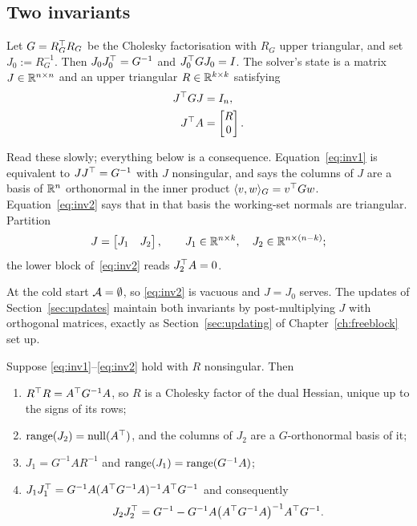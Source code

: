 \subsection{Two invariants}

Let $G = R_G^{\top} R_G$ be the Cholesky factorisation with $R_G$ upper triangular, and
set $J_0 := R_G^{-1}$. Then $J_0 J_0^{\top} = G^{-1}$ and $J_0^{\top} G J_0 = I$. The
solver's state is a matrix $J \in \mathbb{R}^{n\times n}$ and an upper triangular
$R \in \mathbb{R}^{k\times k}$ satisfying
\begin{align}
  J^{\top} G J &= I_n, \label{eq:inv1}\\
  J^{\top} A &= \begin{bmatrix} R \\ 0 \end{bmatrix}. \label{eq:inv2}
\end{align}

Read these slowly; everything below is a consequence. Equation~\eqref{eq:inv1} is
equivalent to $JJ^{\top} = G^{-1}$ with $J$ nonsingular, and says the columns of $J$ are
a basis of $\mathbb{R}^n$ orthonormal in the inner product
$\langle v, w \rangle_G = v^{\top} G w$. Equation~\eqref{eq:inv2} says that in that basis the
working-set normals are triangular. Partition
\begin{equation}
  J = \begin{bmatrix} J_1 & J_2 \end{bmatrix},
  \qquad J_1 \in \mathbb{R}^{n\times k},\quad J_2 \in \mathbb{R}^{n\times(n-k)};
  \label{eq:split}
\end{equation}
the lower block of~\eqref{eq:inv2} reads $J_2^{\top} A = 0$.

At the cold start $\mathcal{A} = \emptyset$, so \eqref{eq:inv2} is vacuous and
$J = J_0$ serves. The updates of Section~\ref{sec:updates} maintain both invariants
by post-multiplying $J$ with orthogonal matrices, exactly as
Section~\ref{sec:updating} of Chapter~\ref{ch:freeblock} set up.

\begin{proposition}
\label{prop:blocks}
Suppose \eqref{eq:inv1}--\eqref{eq:inv2} hold with $R$ nonsingular. Then
\begin{enumerate}
  \item[(i)] $R^{\top} R = A^{\top} G^{-1} A$, so $R$ is a Cholesky factor of the dual
        Hessian, unique up to the signs of its rows;
  \item[(ii)] $\operatorname{range}(J_2) = \operatorname{null}(A^{\top})$, and the columns of $J_2$ are a
        $G$-orthonormal basis of it;
  \item[(iii)] $J_1 = G^{-1} A R^{-1}$ and $\operatorname{range}(J_1) = \operatorname{range}(G^{-1}A)$;
  \item[(iv)] $J_1 J_1^{\top} = G^{-1}A(A^{\top} G^{-1}A)^{-1}A^{\top} G^{-1}$ and consequently
        \begin{equation}
          J_2 J_2^{\top} = G^{-1} - G^{-1}A\bigl(A^{\top} G^{-1}A\bigr)^{-1}A^{\top} G^{-1}.
          \label{eq:reduced}
        \end{equation}
\end{enumerate}
\end{proposition}

